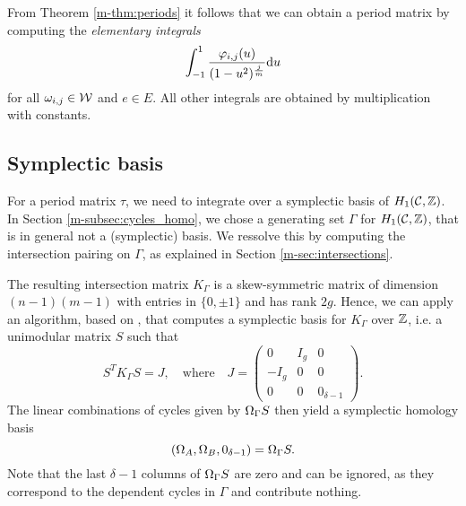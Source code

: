 \documentclass[main.tex]{subfiles}
\begin{document}
  \begin{rmk}\label{rmk:elem_ints}
   From Theorem \ref{m-thm:periods} it follows that we can obtain a period matrix by computing the \emph{elementary integrals}
   \begin{equation}\label{eq:elem_ints}
       \int_{-1}^1 \frac{\varphi_{i,j}(u)}{(1-u^2)^{\frac{j}{m}}}  \mathrm d u
   \end{equation}
   for all $\omega_{i,j} \in \mathcal{W}$ and $e \in E$. All other integrals are obtained by multiplication with constants.
   \end{rmk}
 
  
  
  \subsection{Symplectic basis}\label{subsec:symp_basis}

  For a period matrix $\tau$, we need to integrate over a symplectic basis of $H_1(\mathcal{C},\mathbb{Z})$. In Section \ref{m-subsec:cycles_homo}, we chose a generating set $\Gamma$ for $H_1(\mathcal{C},\mathbb{Z})$, that is in general not
  a (symplectic) basis. We ressolve this by computing the intersection pairing on $\Gamma$, as explained in Section \ref{m-sec:intersections}. 
  
  The resulting intersection matrix $K_{\Gamma}$
   is a skew-symmetric matrix of dimension \\ $(n-1)(m-1)$ with entries in $\{ 0,\pm 1\}$ and has rank $2g$. Hence, we can apply an algorithm, based on
    \cite[Theorem 18]{KB2002}, that computes a symplectic basis
   for $K_{\Gamma}$ over $\mathbb{Z}$, i.e. a unimodular matrix $S$ such that
  $$S^T K_{\Gamma}  S = J, \quad \text{where} \quad J = \begin{pmatrix} 0 & I_g & 0 \\ -I_g & 0 & 0 \\ 0 & 0 & 0_{\delta-1} \end{pmatrix}.$$
  The linear combinations of cycles given by $\Omega_{\Gamma} S$ then yield a symplectic homology basis
  \begin{equation}\label{eq:symp_basis}
   (\Omega_A,\Omega_B, 0_{\delta-1}) = \Omega_{\Gamma} S.
  \end{equation}
  Note that the last $\delta-1$ columns of $\Omega_{\Gamma} S$ are zero and can be ignored, as they correspond to the dependent cycles
  in $\Gamma$ and contribute nothing.


\biblio
\end{document}
